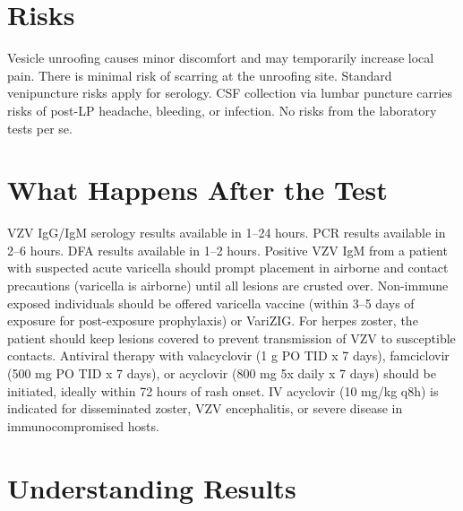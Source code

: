 \section*{Risks}
Vesicle unroofing causes minor discomfort and may temporarily increase local pain. There is minimal risk of scarring at the unroofing site. Standard venipuncture risks apply for serology. CSF collection via lumbar puncture carries risks of post-LP headache, bleeding, or infection. No risks from the laboratory tests per se.

\section*{What Happens After the Test}
VZV IgG/IgM serology results available in 1--24 hours. PCR results available in 2--6 hours. DFA results available in 1--2 hours. Positive VZV IgM from a patient with suspected acute varicella should prompt placement in airborne and contact precautions (varicella is airborne) until all lesions are crusted over. Non-immune exposed individuals should be offered varicella vaccine (within 3--5 days of exposure for post-exposure prophylaxis) or VariZIG. For herpes zoster, the patient should keep lesions covered to prevent transmission of VZV to susceptible contacts. Antiviral therapy with valacyclovir (1 g PO TID x 7 days), famciclovir (500 mg PO TID x 7 days), or acyclovir (800 mg 5x daily x 7 days) should be initiated, ideally within 72 hours of rash onset. IV acyclovir (10 mg/kg q8h) is indicated for disseminated zoster, VZV encephalitis, or severe disease in immunocompromised hosts.

\section*{Understanding Results}


